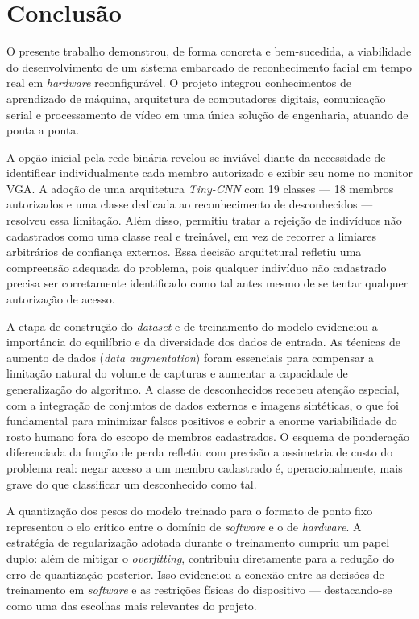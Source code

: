 \chapter{Conclusão}
O presente trabalho demonstrou, de forma concreta e bem-sucedida, a viabilidade do desenvolvimento de um sistema embarcado de reconhecimento facial em tempo real em \textit{\textit{hardware}} reconfigurável. O projeto integrou conhecimentos de aprendizado de máquina, arquitetura de computadores digitais, comunicação serial e processamento de vídeo em uma única solução de engenharia, atuando de ponta a ponta.

A opção inicial pela rede binária revelou-se inviável diante da necessidade de identificar individualmente cada membro autorizado e exibir seu nome no monitor VGA. A adoção de uma arquitetura \textit{Tiny-CNN} com 19 classes — 18 membros autorizados e uma classe dedicada ao reconhecimento de desconhecidos — resolveu essa limitação. Além disso, permitiu tratar a rejeição de indivíduos não cadastrados como uma classe real e treinável, em vez de recorrer a limiares arbitrários de confiança externos. Essa decisão arquitetural refletiu uma compreensão adequada do problema, pois qualquer indivíduo não cadastrado precisa ser corretamente identificado como tal antes mesmo de se tentar qualquer autorização de acesso.

A etapa de construção do \textit{dataset} e de treinamento do modelo evidenciou a importância do equilíbrio e da diversidade dos dados de entrada. As técnicas de aumento de dados (\textit{data augmentation}) foram essenciais para compensar a limitação natural do volume de capturas e aumentar a capacidade de generalização do algoritmo. A classe de desconhecidos recebeu atenção especial, com a integração de conjuntos de dados externos e imagens sintéticas, o que foi fundamental para minimizar falsos positivos e cobrir a enorme variabilidade do rosto humano fora do escopo de membros cadastrados. O esquema de ponderação diferenciada da função de perda refletiu com precisão a assimetria de custo do problema real: negar acesso a um membro cadastrado é, operacionalmente, mais grave do que classificar um desconhecido como tal.

A quantização dos pesos do modelo treinado para o formato de ponto fixo representou o elo crítico entre o domínio de \textit{software} e o de \textit{hardware}. A estratégia de regularização adotada durante o treinamento cumpriu um papel duplo: além de mitigar o \textit{overfitting}, contribuiu diretamente para a redução do erro de quantização posterior. Isso evidenciou a conexão entre as decisões de treinamento em \textit{software} e as restrições físicas do dispositivo — destacando-se como uma das escolhas mais relevantes do projeto.

